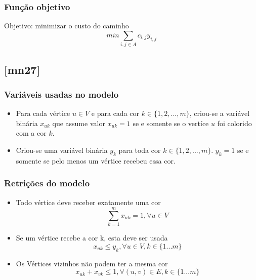 \documentclass[11pt,letterpaper]{article}
\begin{document}
\subsubsection*{Função objetivo}
Objetivo: minimizar o custo do caminho 
\begin{equation}
min\sum_{{i,j} \in A}c_{i,j}y_{i,j}
\end{equation}

\subsection{{[}mn27{]}}

\subsubsection*{Variáveis usadas no modelo}
\begin{itemize}
\item Para cada vértice $u \in V$ e para cada cor $k \in \{1,2,...,m\}$, criou-se
a variável binária $x_{uk}$ que assume valor $x_{uk}=1$ se e somente se o vertíce $u$ foi
colorido com a cor $k$.

\item Criou-se uma variável binária $y_k$ para toda cor $k \in
  \{1,2,...,m\}$. $y_k=1$ se e somente se pelo menos um vértice recebeu essa cor.
\end{itemize}

\subsubsection*{Retrições do modelo}
\begin{itemize}

\item Todo vértice deve receber exatamente uma cor
\begin{equation*}
  \sum_{k=1}^{m}x_{uk}=1, \forall u \in V
\end{equation*}

\item Se um vértice recebe a cor k, esta deve ser usada
\begin{equation*}
  x_{uk} \leq y_k, \forall u \in V, k \in \{1 ... m\}
\end{equation*}

\item Os Vértices vizinhos não podem ter a mesma cor
\begin{equation*}
  x_{uk} + x_{vk} \leq 1, \forall (u,v) \in E, k \in \{1 ... m\}
\end{equation*}
 
\end{itemize}
\end{document}
